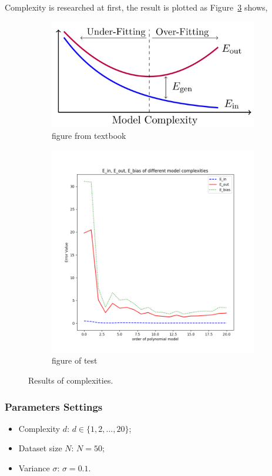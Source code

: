 \documentclass{article}
\begin{document}
Complexity is researched at first, the result is plotted as Figure~\ref{fig:complex_nonreg} shows,
\begin{figure}[h]
\centering
\begin{subfigure}{.45\textwidth}
  \centering
  \includegraphics[width=.9\linewidth]{d_txtbook.jpg}
  \caption{\small figure from textbook}
  \label{fig:sub1}
\end{subfigure}%
\begin{subfigure}{.45\textwidth}
  \centering
  \includegraphics[width=.9\linewidth]{test_d_noreg.png}
  \caption{\small figure of test}
  \label{fig:sub2}
\end{subfigure}
\caption{\small Results of complexities.}
\label{fig:complex_nonreg}
\end{figure}

\subsubsection{Parameters Settings}
\begin{itemize}
    \item Complexity $d$: $d \in \{ 1, 2, ..., 20 \}$;
    \item Dataset size $N$: $N = 50$;
    \item Variance $\sigma$: $\sigma = 0.1$.
\end{itemize}
\end{document}
